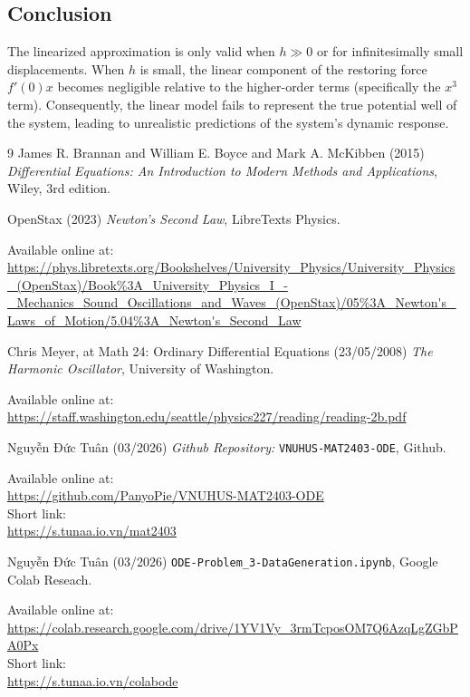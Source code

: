 \documentclass[12pt, a4paper]{report}
\begin{document}
	\subsection{Conclusion}
	
	The linearized approximation is only valid when $h \gg 0$ or for infinitesimally small displacements. When $h$ is small, the linear component of the restoring force $f'(0)x$ becomes negligible relative to the higher-order terms (specifically the $x^3$ term). Consequently, the linear model fails to represent the true potential well of the system, leading to unrealistic predictions of the system's dynamic response.

	\cleardoublepage
	
	\begin{thebibliography}{9}
		James R. Brannan and William E. Boyce and Mark A. McKibben (2015) \emph{Differential Equations: An Introduction to Modern Methods and Applications}, Wiley, 3rd edition.
		
		OpenStax (2023) \textit{Newton's Second Law}, LibreTexts Physics.
		\begin{flushleft}
			\small
			Available online at: \\
			\url{https://phys.libretexts.org/Bookshelves/University_Physics/University_Physics_(OpenStax)/Book\%3A_University_Physics_I_-_Mechanics_Sound_Oscillations_and_Waves_(OpenStax)/05\%3A_Newton's_Laws_of_Motion/5.04\%3A_Newton's_Second_Law}
		\end{flushleft}
		
		\bibitem{harmonic_oscialltor}
		Chris Meyer, at Math 24: Ordinary Differential Equations (23/05/2008) \emph{The Harmonic Oscillator}, University of Washington.
		\begin{flushleft}
			\small
			Available online at: \\ 
			\url{https://staff.washington.edu/seattle/physics227/reading/reading-2b.pdf}
		\end{flushleft}
		
		\bibitem{github_repo}
		Nguyễn Đức Tuân (03/2026) \emph{Github Repository:} \texttt{VNUHUS-MAT2403-ODE}, Github.
		\begin{flushleft}
			\small
			Available online at: \\ 
			\url{https://github.com/PanyoPie/VNUHUS-MAT2403-ODE} \\
			Short link: \\
			\url{https://s.tunaa.io.vn/mat2403}
		\end{flushleft}
		
		\bibitem{colab}
		Nguyễn Đức Tuân (03/2026) \texttt{ODE-Problem\_3-DataGeneration.ipynb}, Google Colab Reseach.
		\begin{flushleft}
			\small
			Available online at: \\ 
			\url{https://colab.research.google.com/drive/1YV1Vy_3rmTcposOM7Q6AzqLgZGbPA0Px} \\
			Short link: \\
			\url{https://s.tunaa.io.vn/colabode}
		\end{flushleft}
	\end{thebibliography}
\end{document}
